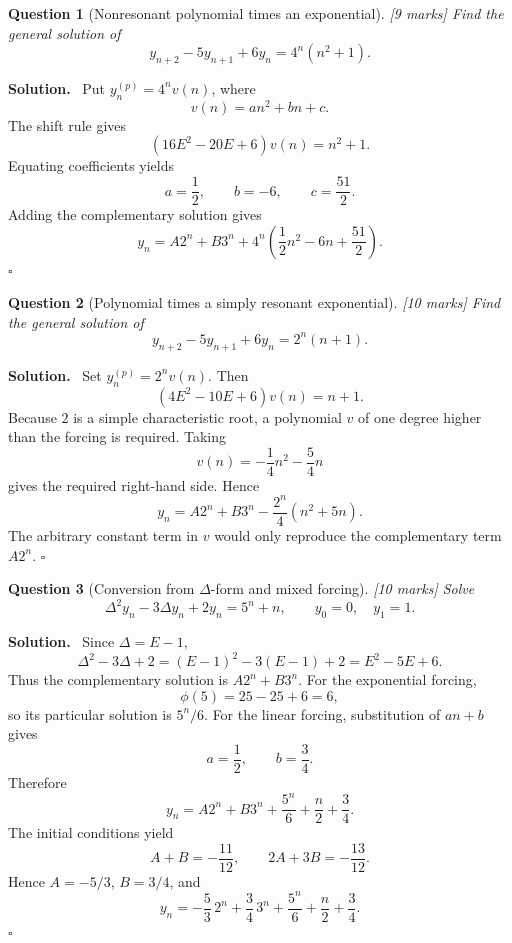 \documentclass[11pt,a4paper]{article}
\theoremstyle{questionstyle}
\newtheorem{question}{Question}
\newenvironment{solution}
  {\par\noindent\textbf{\color{solutiongreen}Solution.}\ }
  {\hfill$\square$\par}
\newcommand{\pointmark}[1]{\hfill\textnormal{\textit{[#1 marks]}}}
\begin{document}
\begin{question}[Nonresonant polynomial times an exponential]\pointmark{9}
Find the general solution of
\[
  y_{n+2}-5y_{n+1}+6y_n=4^n(n^2+1).
\]
\end{question}

\begin{solution}
Put \(y_n^{(p)}=4^nv(n)\), where
\[
  v(n)=an^2+bn+c.
\]
The shift rule gives
\[
  (16E^2-20E+6)v(n)=n^2+1.
\]
Equating coefficients yields
\[
  a=\frac12,\qquad b=-6,\qquad c=\frac{51}{2}.
\]
Adding the complementary solution gives
\[
  \boxed{
  y_n=A2^n+B3^n+
  4^n\left(\frac12n^2-6n+\frac{51}{2}\right)}.
\]
\end{solution}

\begin{question}[Polynomial times a simply resonant exponential]\pointmark{10}
Find the general solution of
\[
  y_{n+2}-5y_{n+1}+6y_n=2^n(n+1).
\]
\end{question}

\begin{solution}
Set \(y_n^{(p)}=2^nv(n)\).  Then
\[
  (4E^2-10E+6)v(n)=n+1.
\]
Because \(2\) is a simple characteristic root, a polynomial \(v\) of
one degree higher than the forcing is required.  Taking
\[
  v(n)=-\frac14n^2-\frac54n
\]
gives the required right-hand side.  Hence
\[
  \boxed{
  y_n=A2^n+B3^n
  -\frac{2^n}{4}(n^2+5n)}.
\]
The arbitrary constant term in \(v\) would only reproduce the
complementary term \(A2^n\).
\end{solution}

\begin{question}[Conversion from \(\Delta\)-form and mixed forcing]\pointmark{10}
Solve
\[
  \Delta^2y_n-3\Delta y_n+2y_n=5^n+n,
  \qquad y_0=0,\quad y_1=1.
\]
\end{question}

\begin{solution}
Since \(\Delta=E-1\),
\[
  \Delta^2-3\Delta+2
  =(E-1)^2-3(E-1)+2=E^2-5E+6.
\]
Thus the complementary solution is \(A2^n+B3^n\).  For the
exponential forcing,
\[
  \phi(5)=25-25+6=6,
\]
so its particular solution is \(5^n/6\).  For the linear forcing,
substitution of \(an+b\) gives
\[
  a=\frac12,\qquad b=\frac34.
\]
Therefore
\[
  y_n=A2^n+B3^n+\frac{5^n}{6}+\frac n2+\frac34.
\]
The initial conditions yield
\[
  A+B=-\frac{11}{12},\qquad
  2A+3B=-\frac{13}{12}.
\]
Hence \(A=-5/3\), \(B=3/4\), and
\[
  \boxed{
  y_n=-\frac53\,2^n+\frac34\,3^n
  +\frac{5^n}{6}+\frac n2+\frac34}.
\]
\end{solution}
\end{document}
